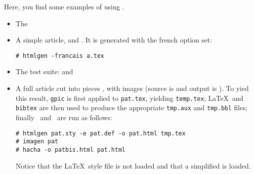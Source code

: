\documentclass{article}
\begin{document}
Here, you find some examples of using \hevea.
\begin{itemize}
\item The 
\item A simple article,   and . It is
generated with the french option set:
\begin{verbatim}
# htmlgen -francais a.tex
\end{verbatim}
\item The test suite:  and 
\item A full article cut into pieces , with images (source is 
and output is ). To yied this result, \verb+gpic+ is first
applied to \verb+pat.tex+, yielding \verb+temp.tex+; \LaTeX\ and
\texttt{bibtex} are then used to produce the appropriate \verb+tmp.aux+ and
\verb+tmp.bbl+ files; finally \hevea\ and \hacha\ are run as
follows:
\begin{verbatim}
# htmlgen pat.sty -e pat.def -o pat.html tmp.tex
# imagen pat
# hacha -o patbis.html pat.html 
\end{verbatim}
Notice that the \LaTeX\ style file  is not loaded and
that a simplified  is loaded.

\end{itemize}
\end{document}
